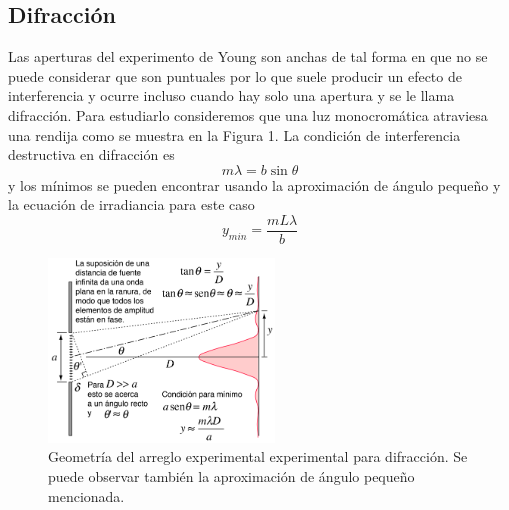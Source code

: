\documentclass[DIV=calc, paper=a4, fontsize=10.5pt]{scrartcl}
\begin{document}
\subsection*{\textcolor{carmine}{Difracción}}
Las aperturas del experimento de Young son anchas de tal forma en que no se puede considerar que son puntuales por lo que suele producir un efecto de interferencia y ocurre incluso cuando hay solo una apertura y se le llama difracción. Para estudiarlo consideremos que una luz monocromática atraviesa una rendija 
como se muestra en la Figura 1. La condición de interferencia destructiva en difracción es 
\begin{equation*}
    m\lambda=b\sin{\theta}
\end{equation*}
y los mínimos se pueden encontrar usando la aproximación de ángulo pequeño y la ecuación de irradiancia para este caso \cite{Manual}
\begin{equation}
     y_{min}=\frac{mL\lambda}{b}
\end{equation}
\begin{figure}[H]
    \centering
    \includegraphics[width=6cm]{fraungeo.png}
    \caption{Geometría del arreglo experimental experimental para difracción. Se puede observar también la aproximación de ángulo pequeño mencionada.\cite{pagina}}
    \label{fig:my_label}
\end{figure}
\end{document}
